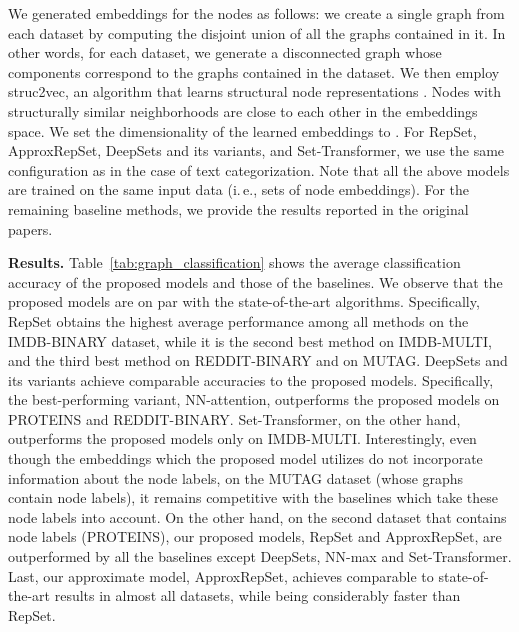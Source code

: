 \documentclass[twoside]{article}
\newcommand{\ie}{i.\,e., }
\begin{document}
We generated embeddings for the nodes as follows: we create a single graph from each dataset by computing the disjoint union of all the graphs contained in it.
In other words, for each dataset, we generate a disconnected graph whose components correspond to the graphs contained in the dataset.
We then employ struc2vec, an algorithm that learns structural node representations \citep{ribeiro2017struc2vec}.
Nodes with structurally similar neighborhoods are close to each other in the embeddings space.
We set the dimensionality of the learned embeddings to .
For RepSet, ApproxRepSet, DeepSets and its variants, and Set-Transformer, we use the same configuration as in the case of text categorization.
Note that all the above models are trained on the same input data (\ie sets of node embeddings).
For the remaining baseline methods, we provide the results reported in the original papers.

\noindent\textbf{Results.}
Table~\ref{tab:graph_classification} shows the average classification accuracy of the proposed models and those of the baselines.
We observe that the proposed models are on par with the state-of-the-art algorithms.
Specifically, RepSet obtains the highest average performance among all methods on the IMDB-BINARY dataset, while it is the second best method on IMDB-MULTI, and the third best method on REDDIT-BINARY and on MUTAG.
DeepSets and its variants achieve comparable accuracies to the proposed models.
Specifically, the best-performing variant, NN-attention, outperforms the proposed models on PROTEINS and REDDIT-BINARY.
Set-Transformer, on the other hand, outperforms the proposed models only on  IMDB-MULTI.
Interestingly, even though the embeddings which the proposed model utilizes do not incorporate information about the node labels, on the MUTAG dataset (whose graphs contain node labels), it remains competitive with the baselines which take these node labels into account.
On the other hand, on the second dataset that contains node labels (PROTEINS), our proposed models, RepSet and ApproxRepSet, are outperformed by all the baselines except DeepSets, NN-max and Set-Transformer.
Last, our approximate model, ApproxRepSet, achieves comparable to state-of-the-art results in almost all datasets, while being considerably faster than RepSet.
\end{document}
